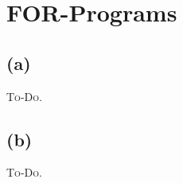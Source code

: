 



\section{\textsc{FOR}-Programs}

\subsection{(a)}

\textsc{To-Do.}

\subsection{(b)}

\textsc{To-Do.}


